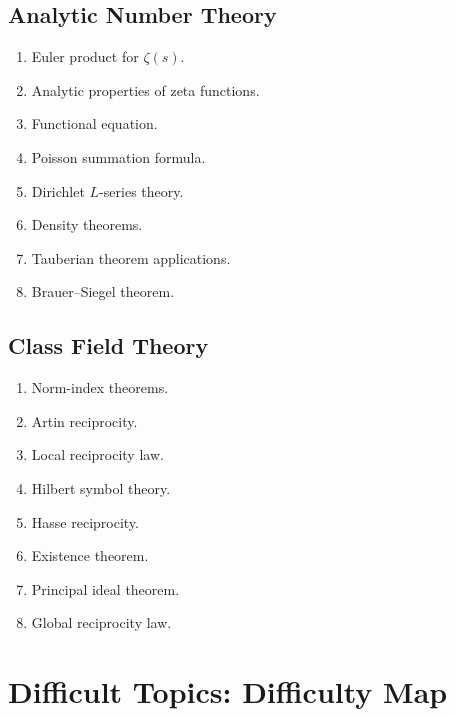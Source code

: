 \documentclass[11pt,a4paper]{article}
\begin{document}
\subsection{Analytic Number Theory}

\begin{enumerate}
    \item Euler product for \(\zeta(s)\).
    \item Analytic properties of zeta functions.
    \item Functional equation.
    \item Poisson summation formula.
    \item Dirichlet \(L\)-series theory.
    \item Density theorems.
    \item Tauberian theorem applications.
    \item Brauer--Siegel theorem.
\end{enumerate}

\subsection{Class Field Theory}

\begin{enumerate}
    \item Norm-index theorems.
    \item Artin reciprocity.
    \item Local reciprocity law.
    \item Hilbert symbol theory.
    \item Hasse reciprocity.
    \item Existence theorem.
    \item Principal ideal theorem.
    \item Global reciprocity law.
\end{enumerate}

\section{Difficult Topics: Difficulty Map}
\end{document}
